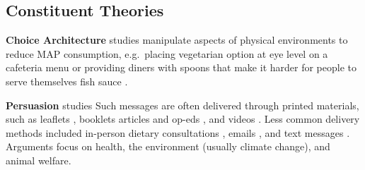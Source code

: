 \documentclass[sn-nature,referee,pdflatex]{sn-jnl}
\begin{document}
\subsection{Constituent Theories}\label{constituent-theories}

\textbf{Choice Architecture} studies
\citep{andersson2021, kanchanachitra2020} manipulate aspects of physical
environments to reduce MAP consumption, e.g.~placing vegetarian option
at eye level on a cafeteria menu \citep{andersson2021} or providing
diners with spoons that make it harder for people to serve themselves
fish sauce \citep{kanchanachitra2020}.

\begin{comment}
Maya suggests we put in a more representative DV
\end{comment}

\textbf{Persuasion} studies
\citep{kanchanachitra2020, abrahamse2007, acharya2004, banerjee2019, bianchi2022, bochmann2017, bschaden2020, carfora2023, hennessy2016, piester2020, cooney2014, cooney2016, feltz2022, haile2021, hatami2018, jalil2023, mathur2021effectiveness, merrill2009, norris2014, peacock2017, polanco2022, sparkman2021, weingarten2022}
Such messages are often delivered through printed materials, such as
leaflets \citep{haile2021, polanco2022}, booklets \citep{bianchi2022}
articles and op-eds \citep{sparkman2021, feltz2022}, and videos
\citep{sparkman2021, cooney2016, mathur2021}. Less common delivery
methods included in-person dietary consultations \citep{merrill2009},
emails \citep{banerjee2019}, and text messages \citep{carfora2022}.
Arguments focus on health, the environment (usually climate change), and
animal welfare.

\begin{comment}
Some are designed to be emotionally activating, e.g. presenting upsetting footage of factory farms [@polanco2022], while others present information more factually, for instance about the relationship between diet and cancer [@hatami2018].
Many persuasion studies combine arguments, such as a lecture on the health and environmental consequences of eating meat
These studies formed the majority of our database.
\end{comment}
\end{document}
